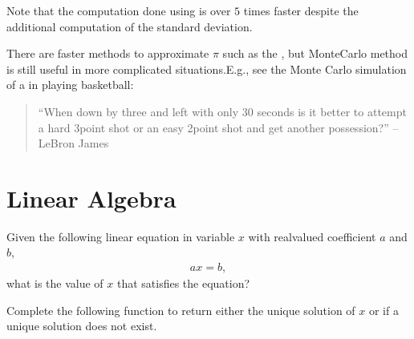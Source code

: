 \documentclass[letterpaper,10pt,english]{sphinxmanual}
\begin{document}
Note that the computation done using  is over \(5\) times faster despite the additional computation of the standard deviation.

There are faster methods to approximate \(\pi\) such as the , but Monte\sphinxhyphen{}Carlo method is still useful in more complicated situations.E.g., see the Monte Carlo simulation of a  in playing basketball:
\begin{quote}

“When down by three and left with only 30 seconds is it better to attempt a hard 3\sphinxhyphen{}point shot or an easy 2\sphinxhyphen{}point shot and get another possession?”   –LeBron James
\end{quote}


\section{Linear Algebra}
\label{\detokenize{Lecture9/Monte Carlo Simulation and Linear Algebra:linear-algebra}}

Given the following linear equation in variable \(x\) with real\sphinxhyphen{}valued coefficient \(a\) and \(b\),
\begin{equation*}
\begin{split} a x = b,\end{split}
\end{equation*}
what is the value of \(x\) that satisfies the equation?

 Complete the following function to return either the unique solution of \(x\) or  if a unique solution does not exist.
\end{document}
